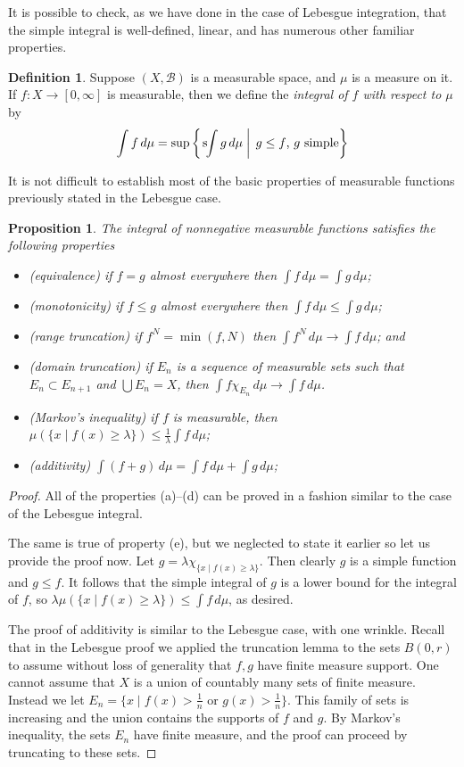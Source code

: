 \documentclass[11pt,oneside]{amsbook}
\newcommand{\sint}{\text{s}\kern-3pt\int}
\theoremstyle{definition}
\theoremstyle{plain}
\newtheorem{prop}[thm]{Proposition}
\theoremstyle{definition}
\newtheorem{defn}[thm]{Definition}
\theoremstyle{remark}
\numberwithin{equation}{section}
\numberwithin{figure}{section}
\begin{document}
It is possible to check, as we have done in the case of Lebesgue integration, that the simple integral is well-defined, linear, and has numerous other familiar properties.

\begin{defn}
  Suppose $(X,\mathcal B)$ is a measurable space, and $\mu$ is a measure on it. If $f\colon X\to[0,\infty]$ is measurable, then we define the \emph{integral of $f$ with respect to $\mu$} by
  \[\int f\,d\mu=\sup\left\{\left.\sint g\,d\mu\;\right|\;g\leq f\text{, $g$ simple}\right\}
  \]
\end{defn}

It is not difficult to establish most of the basic properties of measurable functions previously stated in the Lebesgue case.

\begin{prop}
  The integral of nonnegative measurable functions satisfies the following properties
  \begin{itemize}
  \item (equivalence) if $f=g$ almost everywhere then $\int f\,d\mu=\int g\,d\mu$;
  \item (monotonicity) if $f\leq g$ almost everywhere then $\int f\,d\mu\leq\int g\,d\mu$;
  \item (range truncation) if $f^N=\min(f,N)$ then $\int f^N\,d\mu\to\int f\,d\mu$; and
  \item (domain truncation) if $E_n$ is a sequence of measurable sets such that $E_n\subset E_{n+1}$ and $\bigcup E_n=X$, then $\int f\chi_{E_n}\,d\mu\to\int f\,d\mu$.
  \item (Markov's inequality) if $f$ is measurable, then $\mu(\{x\mid f(x)\geq\lambda\})\leq\frac1\lambda\int f\,d\mu$;
  \item (additivity) $\int(f+g)\,d\mu=\int f\,d\mu+\int g\,d\mu$;
  \end{itemize}
\end{prop}

\begin{proof}
  All of the properties (a)--(d) can be proved in a fashion similar to the case of the Lebesgue integral.

  The same is true of property (e), but we neglected to state it earlier so let us provide the proof now. Let $g=\lambda\chi_{\{x\mid f(x)\geq\lambda\}}$. Then clearly $g$ is a simple function and $g\leq f$. It follows that the simple integral of $g$ is a lower bound for the integral of $f$, so $\lambda\mu(\{x\mid f(x)\geq\lambda\})\leq\int f\,d\mu$, as desired.

  The proof of additivity is similar to the Lebesgue case, with one wrinkle. Recall that in the Lebesgue proof we applied the truncation lemma to the sets $B(0,r)$ to assume without loss of generality that $f,g$ have finite measure support. One cannot assume that $X$ is a union of countably many sets of finite measure. Instead we let $E_n=\{x\mid f(x)>\frac1n\text{ or }g(x)>\frac1n\}$. This family of sets is increasing and the union contains the supports of $f$ and $g$. By Markov's inequality, the sets $E_n$ have finite measure, and the proof can proceed by truncating to these sets.
\end{proof}
\end{document}
